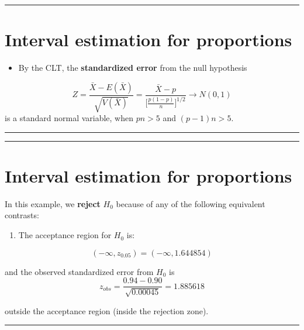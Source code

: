 \documentclass[
]{book}
\providecommand{\tightlist}{%
  \setlength{\itemsep}{0pt}\setlength{\parskip}{0pt}}
\begin{document}
\begin{center}\rule{0.5\linewidth}{0.5pt}\end{center}

\hypertarget{interval-estimation-for-proportions-5}{%
\section{Interval estimation for proportions}\label{interval-estimation-for-proportions-5}}

\begin{itemize}
\tightlist
\item
  By the CLT, the \textbf{standardized error} from the null hypothesis
\end{itemize}

\[Z=\frac{\bar{X}-E(\bar{X})}{\sqrt{V(\bar{X})}}= \frac{\bar{X}-p}{\big[\frac{p(1-p)}{n} \big]^{1/2}}\rightarrow N(0,1)\]
is a standard normal variable, when \(pn>5\) and \((p-1)n>5\).

\begin{center}\rule{0.5\linewidth}{0.5pt}\end{center}

\begin{center}\rule{0.5\linewidth}{0.5pt}\end{center}

\hypertarget{interval-estimation-for-proportions-6}{%
\section{Interval estimation for proportions}\label{interval-estimation-for-proportions-6}}

In this example, we \textbf{reject} \(H_0\) because of any of the following equivalent contrasts:

\begin{enumerate}
\def\labelenumi{\arabic{enumi}.}
\tightlist
\item
  The acceptance region for \(H_0\) is:
\end{enumerate}

\[(-\infty, z_{0.05})=( -\infty,  1.644854)\]

and the observed standardized error from \(H_0\) is
\[z_{obs} =  \frac{0.94-0.90}{\sqrt{0.00045}}=1.885618\]

outside the acceptance region (inside the rejection zone).

\begin{center}\rule{0.5\linewidth}{0.5pt}\end{center}
\end{document}
